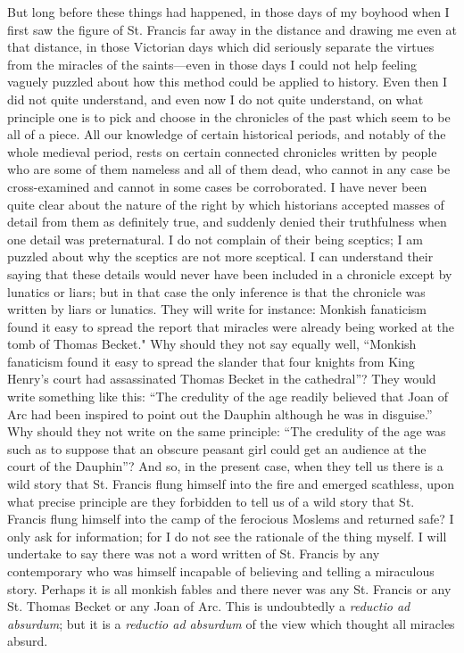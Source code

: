\documentclass{book}
\begin{document}
But long before these things had happened, in those days of my boyhood when I first saw the figure of St. Francis far away in the distance and drawing me even at that distance, in those Victorian days which did seriously separate the virtues from the miracles of the saints—even in those days I could not help feeling vaguely puzzled about how this method could be applied to history. Even then I did not quite understand, and even now I do not quite understand, on what principle one is to pick and choose in the chronicles of the past which seem to be all of a piece. All our knowledge of certain historical periods, and notably of the whole medieval period, rests on certain connected chronicles written by people who are some of them nameless and all of them dead, who cannot in any case be cross-examined and cannot in some cases be corroborated. I have never been quite clear about the nature of the right by which historians accepted masses of detail from them as definitely true, and suddenly denied their truthfulness when one detail was preternatural. I do not complain of their being sceptics; I am puzzled about why the sceptics are not more sceptical. I can understand their saying that these details would never have been included in a chronicle except by lunatics or liars; but in that case the only inference is that the chronicle was written by liars or lunatics. They will write for instance: Monkish fanaticism found it easy to spread the report that miracles were already being worked at the tomb of Thomas Becket." Why should they not say equally well, “Monkish fanaticism found it easy to spread the slander that four knights from King Henry’s court had assassinated Thomas Becket in the cathedral”? They would write something like this: “The credulity of the age readily believed that Joan of Arc had been inspired to point out the Dauphin although he was in disguise.” Why should they not write on the same principle: “The credulity of the age was such as to suppose that an obscure peasant girl could get an audience at the court of the Dauphin”? And so, in the present case, when they tell us there is a wild story that St. Francis flung himself into the fire and emerged scathless, upon what precise principle are they forbidden to tell us of a wild story that St. Francis flung himself into the camp of the ferocious Moslems and returned safe? I only ask for information; for I do not see the rationale of the thing myself. I will undertake to say there was not a word written of St. Francis by any contemporary who was himself incapable of believing and telling a miraculous story. Perhaps it is all monkish fables and there never was any St. Francis or any St. Thomas Becket or any Joan of Arc. This is undoubtedly a \emph{reductio ad absurdum}; but it is a \emph{reductio ad absurdum} of the view which thought all miracles absurd.
\end{document}
